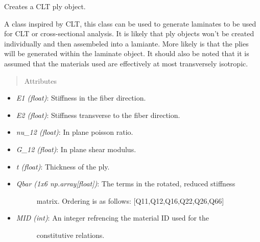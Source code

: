 \documentclass[letterpaper,10pt,english]{sphinxmanual}
\begin{document}
\begin{fulllineitems}
\label{structures:AeroComBAT.Structures.Ply}
Creates a CLT ply object.

A class inspired by CLT, this class can be used to generate laminates
to be used for CLT or cross-sectional analysis. It is likely that ply
objects won't be created individually and then assembeled into a lamiante.
More likely is that the plies will be generated within the laminate object.
It should also be noted that it is assumed that the materials used are
effectively at most transversely isotropic.
\begin{quote}\begin{description}
\item[{Attributes}] \leavevmode
\end{description}\end{quote}
\begin{itemize}
\item {} 
\emph{E1 (float)}: Stiffness in the fiber direction.

\item {} 
\emph{E2 (float)}: Stiffness transverse to the fiber direction.

\item {} 
\emph{nu\_12 (float)}: In plane poisson ratio.

\item {} 
\emph{G\_12 (float)}: In plane shear modulus.

\item {} 
\emph{t (float)}: Thickness of the ply.

\item {} \begin{description}
\item[{\emph{Qbar (1x6 np.array{[}float{]})}: The terms in the rotated, reduced stiffness}] \leavevmode
matrix. Ordering is as follows: {[}Q11,Q12,Q16,Q22,Q26,Q66{]}

\end{description}

\item {} \begin{description}
\item[{\emph{MID (int)}: An integer refrencing the material ID used for the}] \leavevmode
constitutive relations.

\end{description}


\end{itemize}
\end{fulllineitems}
\end{document}
